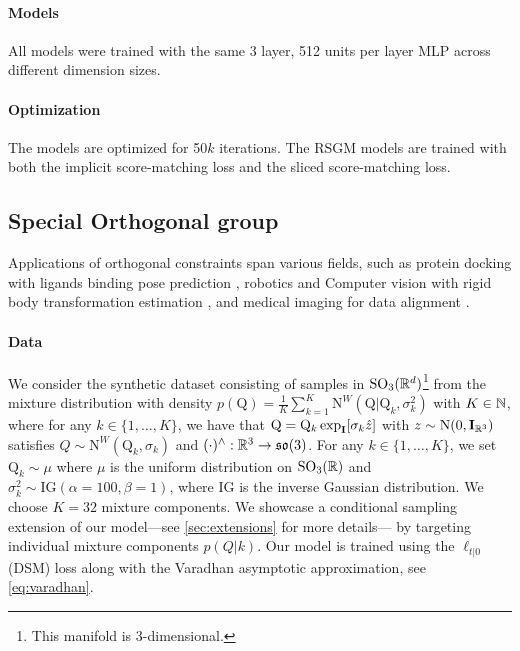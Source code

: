 \paragraph{Models}

All models were trained with the same 3 layer, 512 units per layer MLP across different dimension sizes.

\paragraph{Optimization}

The models are optimized for 50$k$ iterations.
The RSGM models are trained with both the implicit score-matching loss and the sliced score-matching loss.

\subsection{Special Orthogonal group}

Applications of orthogonal constraints span various fields, such as protein docking with ligands binding pose prediction \parencite{ganea2022independent}, robotics and Computer vision with rigid body transformation estimation \parencite{barfoot2011Pose,deepdirectstat2018}, and medical imaging for data alignment \parencite{hou2018Computinga}.

\paragraph{Data}
We consider the synthetic dataset consisting of samples in $\mathrm{SO}_3(\mathbb{R}^d)$\footnote{This manifold is $3$-dimensional.
} from the
mixture distribution with density
$p(\mathrm{Q})=\frac{1}{K} \sum_{k=1}^K
	\mathrm{N}^W(\mathrm{Q}|\mathrm{Q}_k,\sigma_k^2)$ with $K \in \mathbb{N}$,
where for any $k \in \{1, \dots, K\}$, we have that
$\mathrm{Q} = \mathrm{Q}_k\exp_{\m{I}}[\sigma_k \hat{z}]$ with
$z \sim \mathrm{N}(0, \m{I}_{\R^3})$ satisfies
$Q \sim \mathrm{N}^W(\mathrm{Q}_k, \sigma_k)$ and $(\cdot)^{\wedge} : \mathbb{R}^3 \rightarrow \mathfrak{so}(3)$.
For any $k \in \{1, \dots, K\}$, we set $\mathrm{Q}_k \sim \mu$ where $\mu$ is the uniform distribution on $\mathrm{SO}_3(\mathbb{R})$ and $\sigma_k^2 \sim \mathrm{IG}(\alpha=100, \beta=1)$, where $\mathrm{IG}$ is the inverse Gaussian distribution.
We choose $K=32$ mixture components.
We showcase a conditional sampling extension of our model---see \cref{sec:extensions} for more details--- by targeting individual mixture components $p(Q|k)$.
Our model is trained using the $\ell_{t|0}$ (DSM) loss along with the Varadhan asymptotic approximation, see \eqref{eq:varadhan}.

